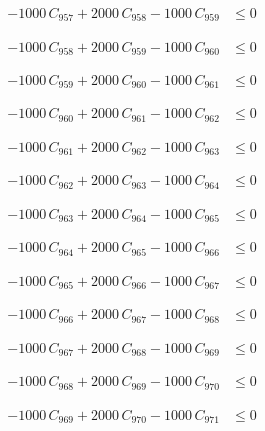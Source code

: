 \documentclass[a4paper,11pt]{article}
\begin{document}
\begin{align}
-1000\,C_{957} + 2000\,C_{958} - 1000\,C_{959} &\leq 0 \nonumber
\end{align}

\begin{align}
-1000\,C_{958} + 2000\,C_{959} - 1000\,C_{960} &\leq 0 \nonumber
\end{align}

\begin{align}
-1000\,C_{959} + 2000\,C_{960} - 1000\,C_{961} &\leq 0 \nonumber
\end{align}

\begin{align}
-1000\,C_{960} + 2000\,C_{961} - 1000\,C_{962} &\leq 0 \nonumber
\end{align}

\begin{align}
-1000\,C_{961} + 2000\,C_{962} - 1000\,C_{963} &\leq 0 \nonumber
\end{align}

\begin{align}
-1000\,C_{962} + 2000\,C_{963} - 1000\,C_{964} &\leq 0 \nonumber
\end{align}

\begin{align}
-1000\,C_{963} + 2000\,C_{964} - 1000\,C_{965} &\leq 0 \nonumber
\end{align}

\begin{align}
-1000\,C_{964} + 2000\,C_{965} - 1000\,C_{966} &\leq 0 \nonumber
\end{align}

\begin{align}
-1000\,C_{965} + 2000\,C_{966} - 1000\,C_{967} &\leq 0 \nonumber
\end{align}

\begin{align}
-1000\,C_{966} + 2000\,C_{967} - 1000\,C_{968} &\leq 0 \nonumber
\end{align}

\begin{align}
-1000\,C_{967} + 2000\,C_{968} - 1000\,C_{969} &\leq 0 \nonumber
\end{align}

\begin{align}
-1000\,C_{968} + 2000\,C_{969} - 1000\,C_{970} &\leq 0 \nonumber
\end{align}

\begin{align}
-1000\,C_{969} + 2000\,C_{970} - 1000\,C_{971} &\leq 0 \nonumber
\end{align}
\end{document}
